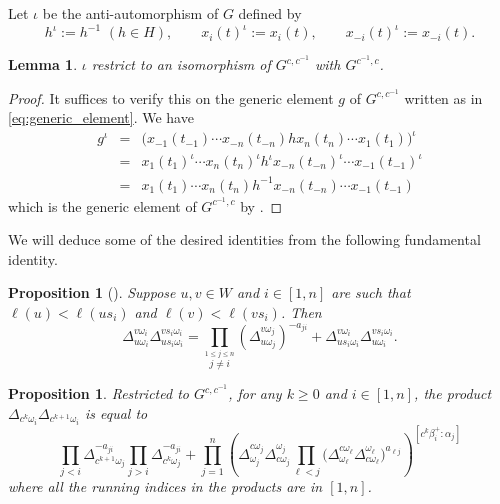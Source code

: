\documentclass[11pt]{amsart}
\newtheorem{lemma}[theorem]{Lemma}
\newtheorem{proposition}[theorem]{Proposition}
\numberwithin{equation}{section}
\begin{document}
Let $\iota$ be the anti-automorphism of $G$ defined by
\begin{equation}
  h^\iota := h^{-1}\,\, (h\in H),
  \quad
  \quad
  x_i(t)^\iota := x_i(t),
  \quad
  \quad
  x_{-i}(t)^\iota := x_{-i}(t).
\end{equation}
\begin{lemma}
  \label{lemma:iota_iso}
  $\iota$ restrict to an isomorphism of $G^{c,c^{-1}}$ with $G^{c^{-1},c}$.
\end{lemma}
\begin{proof}
  It suffices to verify this on the generic element $g$ of $G^{c,c^{-1}}$ written as in \cref{eq:generic_element}.
  We have 
  \begin{eqnarray*}
    g^\iota &=& \big(x_{-1}(t_{-1}) \cdots x_{-n}(t_{-n}) h x_n(t_n) \cdots x_1(t_1)\big)^\iota\\
    &=& x_1(t_1)^\iota \cdots x_n(t_n)^\iota h^\iota x_{-n}(t_{-n})^\iota \cdots x_{-1}(t_{-1})^\iota\\
    &=& x_1(t_1) \cdots x_n(t_n) h^{-1} x_{-n}(t_{-n}) \cdots x_{-1}(t_{-1})
  \end{eqnarray*}
  which is the generic element of $G^{c^{-1},c}$ by \cite[Proposition 3.2]{Wil13}.
\end{proof}

We will deduce some of the desired identities from the following fundamental identity.
\begin{proposition}[{\cite[Proposition 2.16]{Wil13}}]
  \label{prop:fundid}
  Suppose $u,v \in W$ and $i\in[1,n]$ are such that $\ell(u)<\ell(us_i)$ and $\ell(v)<\ell(vs_i)$. 
  Then 
  \begin{equation}
    \label{eq:fundid}
    \Delta_{u\omega_i}^{v\omega_i} \Delta_{us_i\omega_i}^{vs_i\omega_i} 
    =
    \prod_{\stackrel{1\leq j \leq n}{j\neq i}}\left(\Delta_{u\omega_j}^{v\omega_j}\right)^{-a_{ji}}
    +
    \Delta_{us_i\omega_i}^{v\omega_i} \Delta_{u\omega_i}^{vs_i\omega_i}
    .
  \end{equation}
\end{proposition}


\begin{proposition}
  \label{prop:projective_minors_identity}
  Restricted to $G^{c,c^{-1}}$, for any $k\geq 0$ and $i\in[1,n]$, the product $\Delta_{c^k\omega_i}\Delta_{c^{k+1}\omega_i}$ is equal to
  \begin{equation} 
    \prod_{j<i}\Delta_{c^{k+1}\omega_j}^{-a_{ji}}
    \prod_{j>i}\Delta_{c^k\omega_j}^{-a_{ji}}
    +
    \prod_{j=1}^n\left( 
      \Delta^{c \omega_j}_{\omega_j}
      \Delta^{\omega_j}_{ c\omega_j} 
      \prod_{\ell<j}\big(
        \Delta^{c \omega_\ell}_{\omega_\ell} 
        \Delta^{\omega_\ell}_{c \omega_\ell}
      \big)^{a_{\ell j}}
    \right)^{[c^k\beta_i^+:\alpha_j]}
  \end{equation}
  where all the running indices in the products are in $[1,n]$.
\end{proposition}
\end{document}
